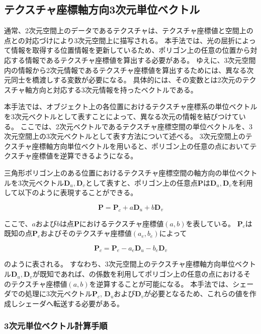 \subsection{テクスチャ座標軸方向3次元単位ベクトル}
\label{SSUnitvec}

通常、2次元空間上のデータであるテクスチャは、テクスチャ座標値と空間上の点との対応づけにより3次元空間上に描写される。
本手法では、光の屈折によって情報を取得する位置情報を更新しているため、ポリゴン上の任意の位置から対応する情報であるテクスチャ座標値を算出する必要がある。
ゆえに、3次元空間内の情報から2次元情報であるテクスチャ座標値を算出するためには、異なる次元同士を橋渡しする変数が必要になる。
具体的には、その変数とは2次元のテクスチャ軸方向と対応する3次元情報を持ったベクトルである。

本手法では、オブジェクト上の各位置におけるテクスチャ座標系の単位ベクトルを3次元ベクトルとして表すことによって、異なる次元の情報を結びつけている。
ここでは、2次元ベクトルであるテクスチャ座標空間の単位ベクトルを、3次元空間上の3次元ベクトルとして表す方法について述べる。
3次元空間上のテクスチャ座標軸方向単位ベクトルを用いると、ポリゴン上の任意の点においてテクスチャ座標値を逆算できるようになる。

三角形ポリゴン上のある位置におけるテクスチャ座標空間の軸方向の単位ベクトルを3次元ベクトル$\bm{D}_u, \bm{D}_v$として表すと、ポリゴン上の任意点$\bm{P}$は$\bm{D}_u, \bm{D}_v$を利用して以下のように表現することができる。

\begin{equation}
\bm{P} = \bm{P}_c + a\bm{D}_u + b\bm{D}_v
\label{EPuv}
\end{equation}

\noindent
ここで、$a$および$b$は点$\bm{P}$におけるテクスチャ座標値$(a, b)$を表している。
$\bm{P}_c$は既知の点$\bm{P}_e$およびそのテクスチャ座標値$(a_e, b_e)$によって

\begin{equation}
\bm{P}_c = \bm{P}_e - a_e\bm{D}_u - b_e\bm{D}_v
\label{EPc}
\end{equation}

\noindent
{}のように表される。
すなわち、3次元空間上のテクスチャ座標軸方向単位ベクトル$\bm{D}_u, \bm{D}_v$が既知であれば、の係数を利用してポリゴン上の任意の点におけるそのテクスチャ座標値$(a, b)$を逆算することが可能になる。
本手法では、シェーダでの処理に3次元ベクトル$\bm{P}_c$, $\bm{D}_u$および$\bm{D}_v$が必要となるため、これらの値を作成しシェーダへ転送する必要がある。

\subsubsection*{3次元単位ベクトル計算手順}

